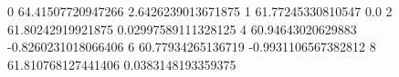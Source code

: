 0 64.41507720947266 2.6426239013671875
1 61.77245330810547 0.0
2 61.80242919921875 0.02997589111328125
4 60.94643020629883 -0.8260231018066406
6 60.77934265136719 -0.9931106567382812
8 61.810768127441406 0.0383148193359375
